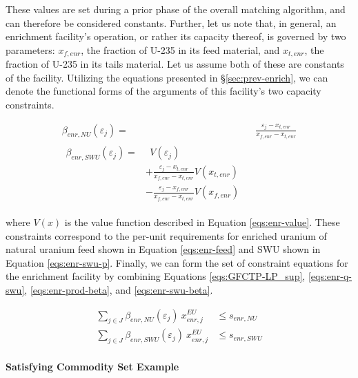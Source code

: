 These values are set during a prior phase of the overall matching algorithm, and
can therefore be considered constants. Further, let us note that, in general, an
enrichment facility's operation, or rather its capacity thereof, is governed by
two parameters: $x_{f,enr}$, the fraction of U-235 in its feed material, and
$x_{t,enr}$, the fraction of U-235 in its tails material. Let us assume both of
these are constants of the facility. Utilizing the equations presented in
\S\ref{sec:prev-enrich}, we can denote the functional forms of the arguments of 
this facility's two capacity constraints.

\begin{align}
\label{eqs:enr-prod-beta}
\beta_{enr,NU}(\varepsilon_{j}) = & \:\: \frac{\varepsilon_{j} - x_{t,enr}}
                                      {x_{f,enr} - x_{t,enr}} \\
\begin{split}
\label{eqs:enr-swu-beta}
\beta_{enr,SWU}(\varepsilon_{j}) = & \:\: V(\varepsilon_{j}) \\
                         & + \frac{\varepsilon_{j} - x_{t,enr}}
                                  {x_{f,enr} - x_{t,enr}} V(x_{t,enr}) \\
                         & - \frac{\varepsilon_{j} - x_{f,enr}}
                                  {x_{f,enr} - x_{t,enr}} V(x_{f,enr})
\end{split}
\end{align}

where $V(x)$ is the value function described in Equation
\ref{eqs:enr-value}. These constraints correspond to the per-unit requirements
for enriched uranium of natural uranium feed shown in Equation
\ref{eqs:enr-feed} and SWU shown in Equation \ref{eqs:enr-swu-p}. Finally, we
can form the set of constraint equations for the enrichment facility by
combining Equations \ref{eqs:GFCTP-LP_sup}, \ref{eqs:enr-q-swu},
\ref{eqs:enr-prod-beta}, and \ref{eqs:enr-swu-beta}.

\begin{align}
\label{eqs:enr-prod-constr}
\sum_{j \in J}\beta_{enr,NU}(\varepsilon_{j}) \: x_{enr,j}^{EU}  & \leq s_{enr,NU} \\
\label{eqs:enr-swu-constr}
\sum_{j \in J}\beta_{enr,SWU}(\varepsilon_{j}) \: x_{enr,j}^{EU} & \leq s_{enr,SWU}
\end{align}

\paragraph{Satisfying Commodity Set Example}~\\

